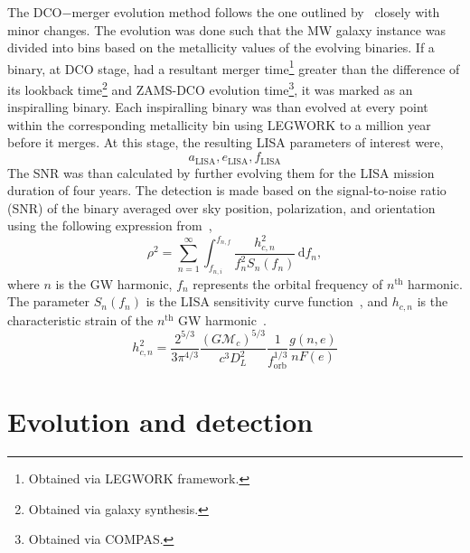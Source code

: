 \documentclass[twocolumn, twocolappendix]{aastex63}
\newcommand{\semaxis}[1]{a_{\text{#1}}}
\newcommand{\ecc}[1]{e_\text{#1}}
\begin{document}
    The DCO$-$merger evolution method follows the one outlined by~\cite{Wagg2021} closely with minor changes.
    The evolution was done such that the MW galaxy instance was divided into bins based on the metallicity values of the evolving binaries.
    If a binary, at DCO stage, had a resultant merger time\footnote{Obtained via LEGWORK framework.} greater than the difference of its lookback time\footnote{Obtained via galaxy synthesis.} and ZAMS-DCO evolution time\footnote{Obtained via COMPAS.}, it was marked as an inspiralling binary.
    Each inspiralling binary was than evolved at every point within the corresponding metallicity bin using LEGWORK to a million year before it merges.
    At this stage, the resulting LISA parameters of interest were,
    \begin{equation}%
        \semaxis{LISA}, \ecc{LISA}, f_{\text{LISA}}
        \label{eq:lisa_parameter_names}
    \end{equation}%
    The SNR was than calculated by further evolving them for the LISA mission duration of four years.
    The detection is made based on the signal-to-noise ratio (SNR) of the binary averaged over sky position, polarization, and orientation using the following expression from~\citep{Finn2000},
    \begin{equation}
        \rho^2 = \sum_{n=1}^{\infty}\int_{f_{n, i}}^{f_{n, f}}\frac{h_{c, n}^2}{f_n^2 S_n(f_n)}\,\text{d}f_n,
        \label{eq:snr_equation}
    \end{equation}
    where $n$ is the GW harmonic, $f_n$ represents the orbital frequency of $n^\text{th}$ harmonic.
    The parameter $S_n(f_n)$ is the LISA sensitivity curve function~\citep{Robson2019}, and $h_{c, n}$ is the characteristic strain of the $n^\text{th}$ GW harmonic~\citep{Barack2004}.
    \begin{equation}
        h_{c,n}^2 = \frac{2^{5/3}}{3\pi^{4/3}}\frac{(G\mathcal{M}_c)^{5/3}}{c^3 D_L^2}\frac{1}{f_\text{orb}^{1/3}}\frac{g(n, e)}{nF(e)}
        \label{eq:characteristic_strain}
    \end{equation}


    \section{Evolution and detection}
    \label{sec:evolution-and-detection}
\end{document}
